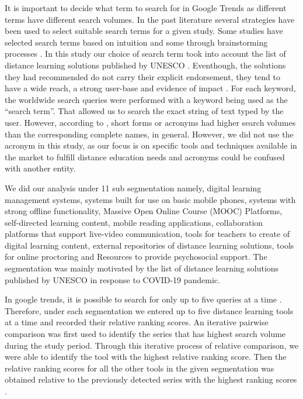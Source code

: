 \documentclass[11pt,a4paper,]{article}
\begin{document}
It is important to decide what term to search for in Google Trends as different terms have different search volumes. In the past literature several strategies have been used to select suitable search terms for a given study. Some studies have selected search terms based on intuition and some through brainstorming processes \autocite{vaughan2014web}. In this study our choice of search term took into account the list of distance learning solutions published by UNESCO \autocite{unesco2020DLsolutions}. Eventhough, the solutions they had recommended do not carry their explicit endorsement, they tend to have a wide reach, a strong user-base and evidence of impact \autocite{unesco2020DLsolutions}. For each keyword, the worldwide search queries were performed with a keyword being used as the ``search term''. That allowed us to search the exact string of text typed by the user. However, according to \textcite{vaughan2014web}, short forms or acronyms had higher search volumes than the corresponding complete names, in general. However, we did not use the acronym in this study, as our focus is on specific tools and techniques available in the market to fulfill distance education needs and acronyms could be confused with another entity.

We did our analysis under 11 sub segmentation namely, digital learning management systems, systems built for use on basic mobile phones, systems with strong offline functionality, Massive Open Online Course (MOOC) Platforms, self-directed learning content, mobile reading applications, collaboration platforms that support live-video communication, tools for teachers to create of digital learning content, external repositories of distance learning solutions, tools for online proctoring and Resources to provide psychosocial support. The segmentation was mainly motivated by the list of distance learning solutions published by UNESCO in response to COVID-19 pandemic.

In google trends, it is possible to search for only up to five queries at a time \autocite{vaughan2014web}. Therefore, under each segmentation we entered up to five distance learning tools at a time and recorded their relative ranking scores. An iterative pairwise comparison was first used to identify the series that has highest search volume during the study period. Through this iterative process of relative comparison, we were able to identify the tool with the highest relative ranking score. Then the relative ranking scores for all the other tools in the given segmentation was obtained relative to the previously detected series with the highest ranking scores \autocite{vaughan2014web}.
\end{document}
